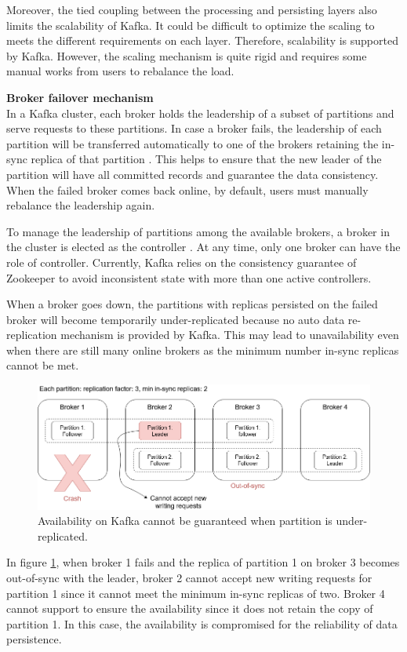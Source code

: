 Moreover, the tied coupling between the processing and persisting layers also limits the scalability of Kafka. It could be difficult to optimize the scaling to meets the different requirements on each layer. Therefore, scalability is supported by Kafka. However, the scaling mechanism is quite rigid and requires some manual works from users to rebalance the load. 

\textbf{Broker failover mechanism}\\
In a Kafka cluster, each broker holds the leadership of a subset of partitions and serve requests to these partitions. In case a broker fails, the leadership of each partition will be transferred automatically to one of the brokers retaining the in-sync replica of that partition \cite{kafkadatareplication}. This helps to ensure that the new leader of the partition will have all committed records and guarantee the data consistency. When the failed broker comes back online, by default, users must manually rebalance the leadership again. 

To manage the leadership of partitions among the available brokers, a broker in the cluster is elected as the controller \cite{kafkaleaderelection}. At any time, only one broker can have the role of controller. Currently, Kafka relies on the consistency guarantee of Zookeeper to avoid inconsistent state with more than one active controllers. 

When a broker goes down, the partitions with replicas persisted on the failed broker will become temporarily under-replicated because no auto data re-replication mechanism is provided by Kafka. This may lead to unavailability even when there are still many online brokers as the minimum number in-sync replicas cannot be met. 

\begin{figure}[h]
	\centering
	\includegraphics[width=\linewidth]{images/broker-failover-kafka.png}
	\caption{Availability on Kafka cannot be guaranteed when partition is under-replicated.}
	\label{fig:brokerfailoverkafka}
\end{figure}
In figure \ref{fig:brokerfailoverkafka}, when broker 1 fails and the replica of partition 1 on broker 3 becomes out-of-sync with the leader, broker 2 cannot accept new writing requests for partition 1 since it cannot meet the minimum in-sync replicas of two. Broker 4 cannot support to ensure the availability since it does not retain the copy of partition 1. In this case, the availability is compromised for the reliability of data persistence.

